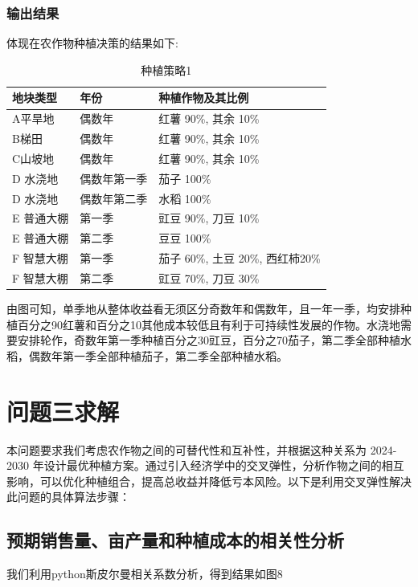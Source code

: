 \documentclass[12pt]{ctexart}
\begin{document}
	\subsubsection{输出结果}
 体现在农作物种植决策的结果如下:
\begin{table}[htbp]
	\centering
	\begin{tabular}{m{5cm} m{5cm} m{6cm}}  
		\toprule  
		地块类型 & 年份 & 种植作物及其比例\\  
		\midrule  
		A平旱地 & 偶数年 & 红薯 90\%, 其余 10\%\\  
		B梯田 & 偶数年& 红薯 90\%, 其余 10\%\\  
		C山坡地  & 偶数年&  红薯 90\%, 其余 10\%\\
		D 水浇地 & 偶数年第一季 & 茄子 100\% \\
		D 水浇地 & 偶数年第二季 & 水稻 100\% \\
		E 普通大棚 & 第一季 & 豇豆 90\%, 刀豆 10\% \\
		E 普通大棚 & 第二季 & 豆豆 100\% \\
		F 智慧大棚 & 第一季 & 茄子 60\%, 土豆 20\%, 西红柿20\% \\
		F 智慧大棚 & 第二季 & 豇豆 70\%, 刀豆 30\% \\
		\bottomrule  
	\end{tabular}  
	\caption{种植策略1}
\end{table}
由图可知，单季地从整体收益看无须区分奇数年和偶数年，且一年一季，均安排种植百分之90红薯和百分之10其他成本较低且有利于可持续性发展的作物。水浇地需要安排轮作，奇数年第一季种植百分之30豇豆，百分之70茄子，第二季全部种植水稻，偶数年第一季全部种植茄子，第二季全部种植水稻。


	
	
	\newpage
	\section{问题三求解}  
	\label{sec:solution3}  
	本问题要求我们考虑农作物之间的可替代性和互补性，并根据这种关系为 2024-2030 年设计最优种植方案。通过引入经济学中的交叉弹性，分析作物之间的相互影响，可以优化种植组合，提高总收益并降低亏本风险。以下是利用交叉弹性解决此问题的具体算法步骤：
	\subsection{预期销售量、亩产量和种植成本的相关性分析}
	我们利用python斯皮尔曼相关系数分析，得到结果如图8
	
\end{document}
